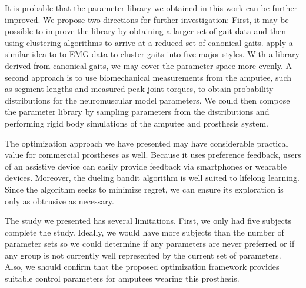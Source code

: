 It is probable that the parameter library we obtained in this work can be
further improved. We propose two directions for further investigation: First, it
may be possible to improve the library by obtaining a larger set of gait data
and then using clustering algorithms to arrive at a reduced set of canonical
gaits. \citet{vardaxis1998classification} apply a similar idea to to EMG data to
cluster gaits into five major styles. With a library derived from canonical
gaits, we may cover the parameter space more evenly. A second approach is to use
biomechanical measurements from the amputee, such as segment lengths and
measured peak joint torques, to obtain probability distributions for the
neuromuscular model parameters. We could then compose the parameter library by
sampling parameters from the distributions and performing rigid body simulations
of the amputee and prosthesis system.

The optimization approach we have presented may have considerable practical
value for commercial prostheses as well. Because it uses preference feedback,
users of an assistive device can easily provide feedback via smartphones or
wearable devices. Moreover, the dueling bandit algorithm is well suited to
lifelong learning. Since the algorithm seeks to minimize regret, we can ensure
its exploration is only as obtrusive as necessary. 

The study we presented has several limitations. First, we only had five subjects
complete the study. Ideally, we would have more subjects than the number of
parameter sets so we could determine if any parameters are never preferred or if
any group is not currently well represented by the current set of parameters.
Also, we should confirm that the proposed optimization framework provides
suitable control parameters for amputees wearing this prosthesis.
